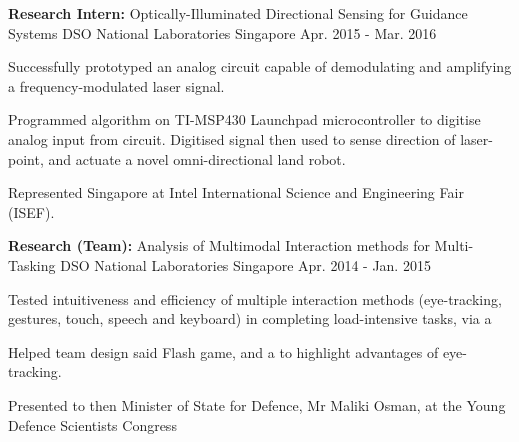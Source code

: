 \begin{cventries}

\label{lightDirectionFinderProject}

\cventry
{\textbf{Research Intern:} Optically-Illuminated Directional Sensing for Guidance Systems 
} %
{DSO National Laboratories} %
{Singapore} %
{Apr. 2015 - Mar. 2016} %
{ %
\begin{cvitems}
	\item { Successfully prototyped an analog circuit capable of demodulating and amplifying a frequency-modulated laser signal. }
	\item { Programmed algorithm on TI-MSP430 Launchpad microcontroller to digitise analog input from circuit. \newline Digitised signal then used to sense direction of laser-point, and actuate a novel omni-directional land robot.}
	\item { Represented Singapore at Intel International Science and Engineering Fair (ISEF). }
\end{cvitems}
}


\label{eyeTrackingProject}

\cventry
{\textbf{Research (Team):} Analysis of Multimodal Interaction methods for Multi-Tasking 
} %
{DSO National Laboratories} %
{Singapore} %
{Apr. 2014 - Jan. 2015} %
{ %
	\begin{cvitems}
		\item { Tested intuitiveness and efficiency of multiple interaction methods (eye-tracking, gestures, touch, speech and keyboard) in completing load-intensive tasks, via a }
		\item { Helped team design said Flash game, and a  to highlight advantages of eye-tracking. }
		\item { Presented to then Minister of State for Defence, Mr Maliki Osman, at the Young Defence Scientists Congress }
	\end{cvitems}
}


\end{cventries}